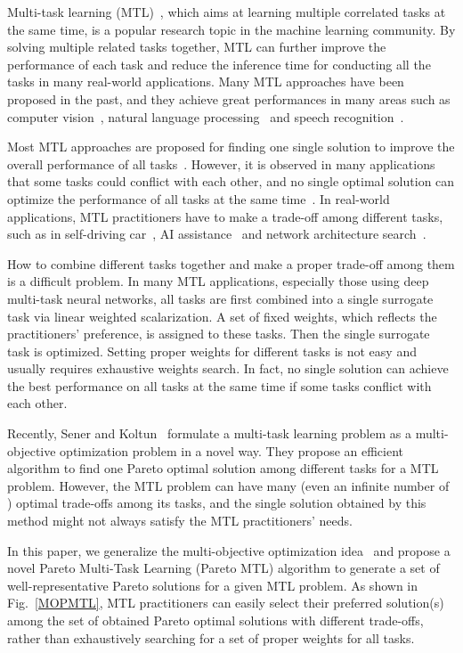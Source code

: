 Multi-task learning (MTL)~\cite{caruana1997multitask}, which aims at learning multiple correlated tasks at the same time, is a popular research topic in the machine learning community. By solving multiple related tasks together, MTL can further improve the performance of each task and reduce the inference time for conducting all the tasks in many real-world applications. Many MTL approaches have been proposed in the past, and they achieve great performances in many areas such as computer vision~\cite{kokkinos2017ubernet}, natural language processing~\cite{subramanian2018learning} and speech recognition~\cite{huang2015rapid}.

Most MTL approaches are proposed for finding one single solution to improve the overall performance of all tasks~\cite{ruder2017overview,zhang2017survey}. However, it is observed in many applications that some tasks could conflict with each other, and no single optimal solution can optimize the performance of all tasks at the same time~\cite{kendall2017multi}. In real-world applications, MTL practitioners have to make a trade-off among different tasks, such as in self-driving car~\cite{wang2018dels}, AI assistance~\cite{kim2017towards} and network architecture search~\cite{dong2018dpp,cai2018proxylessnas}.

\clearpage

How to combine different tasks together and make a proper trade-off among them is a difficult problem. In many MTL applications, especially those using deep multi-task neural networks, all tasks are first combined into a single surrogate task via linear weighted scalarization. A set of fixed weights, which reflects the practitioners' preference, is assigned to these tasks. Then the single surrogate task is optimized. Setting proper weights for different tasks is not easy and usually requires exhaustive weights search. In fact, no single solution can achieve the best performance on all tasks at the same time if some tasks conflict with each other.

Recently, Sener and Koltun~\cite{sener2018multi} formulate a multi-task learning problem as a multi-objective optimization problem in a novel way. They propose an efficient algorithm to find one Pareto optimal solution among different tasks for a MTL problem. However, the MTL problem can have many (even an infinite number of ) optimal trade-offs among its tasks, and the single solution obtained by this method might not always satisfy the MTL practitioners' needs.

In this paper, we generalize the multi-objective optimization idea~\cite{sener2018multi} and propose a novel Pareto Multi-Task Learning (Pareto MTL) algorithm to generate a set of well-representative Pareto solutions for a given MTL problem. As shown in Fig.~\ref{MOPMTL}, MTL practitioners can easily select their preferred solution(s) among the set of obtained Pareto optimal solutions with different trade-offs, rather than exhaustively searching for a set of proper weights for all tasks.

